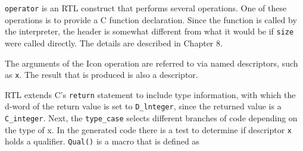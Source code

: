 
\texttt{operator} is an RTL construct that performs several
operations. One of these operations is to provide a C function
declaration. Since the function is called by the interpreter, the
header is somewhat different from what it would be if \texttt{size}
were called directly. The details are described in Chapter 8.

The arguments of the Icon operation are referred to via named
descriptors, such as \texttt{x}. The result that is produced is also a
descriptor.

RTL extends C's \texttt{return} statement to include type information,
with which the d-word of the return value is set to
\texttt{D\_lnteger}, since the returned value is a
\texttt{C\_integer}. Next, the \texttt{type\_case} selects different
branches of code depending on the type of x. In the generated code
there is a test to determine if descriptor \texttt{x} holds a
qualifier. \texttt{Qual()} is a macro that is defined as

